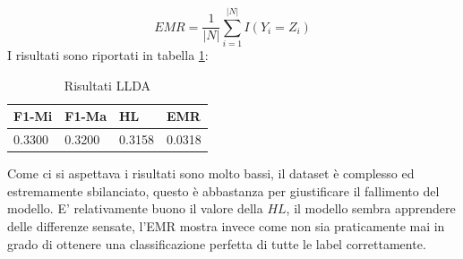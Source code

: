 \documentclass[technote]{IEEEtran}
\begin{document}
\begin{equation}
EMR = \frac{1}{|N|}\sum_{i=1}^{|N|}I(Y_i = Z_i)
\end{equation}
I risultati sono riportati in tabella \ref{t_res_llda}:\\
\begin{table}[H]
\centering
\caption{Risultati LLDA}
\begin{tabular}{|l|l|l|l|}
\hline
\textbf{F1-Mi} & \textbf{F1-Ma} & \textbf{HL} & \textbf{EMR} \\ \hline
0.3300         & 0.3200         & 0.3158      & 0.0318       \\ \hline
\end{tabular}
\label{t_res_llda}
\end{table}
Come ci si aspettava i risultati sono molto bassi, il dataset è complesso ed estremamente sbilanciato, questo è abbastanza per giustificare il fallimento del modello. E' relativamente buono il valore della $ HL $, il modello sembra apprendere delle differenze sensate, l'EMR mostra invece come non sia praticamente mai in grado di ottenere una classificazione perfetta di tutte le label correttamente.
\end{document}
